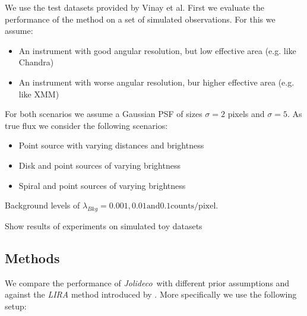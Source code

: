 \documentclass[twocolumn]{aastex631}
\newcommand{\jolideco}{\textit{Jolideco}~}
\begin{document}
    We use the test datasets provided by Vinay et al.
    First we evaluate the performance of the method on a set of simulated observations.
    For this we assume:

    \begin{itemize}
        \item An instrument with good angular resolution, but low effective area (e.g. like Chandra)
        \item An instrument with worse angular resolution, bur higher effective area (e.g. like XMM)
    \end{itemize}

    For both scenarios we assume a Gaussian PSF of sizes $\sigma = 2$ pixels and  $\sigma = 5$.
    As true flux we consider the following scenarios:

    \begin{itemize}
        \item Point source with varying distances and brightness
        \item Disk and point sources of varying brightness
        \item Spiral and point sources of varying brightness
    \end{itemize}

    Background levels of $\lambda_{Bkg}= 0.001, 0.01 \textrm{and} 0.1 \textrm{counts/pixel}$. 
    
    Show results of experiments on simulated toy datasets

    \subsection{Methods}
    We compare the performance of \jolideco with different prior assumptions and against the \textit{LIRA} method introduced by \cite{Esch2004}. More specifically we use the following setup:
\end{document}
